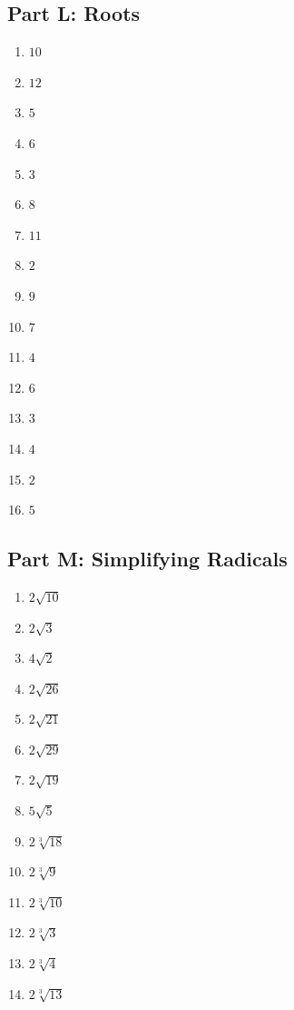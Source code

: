 \documentclass[11pt]{article}
\begin{document}
\subsection*{Part L: Roots}
\begin{multicols}{3}
\begin{enumerate}
  \item $10$
  \item $12$
  \item $5$
  \item $6$
  \item $3$
  \item $8$
  \item $11$
  \item $2$
  \item $9$
  \item $7$
  \item $4$
  \item $6$
  \item $3$
  \item $4$
  \item $2$
  \item $5$
\end{enumerate}
\end{multicols}
\subsection*{Part M: Simplifying Radicals}
\begin{multicols}{3}
\begin{enumerate}
  \item $2 \sqrt{10}$
  \item $2 \sqrt{3}$
  \item $4 \sqrt{2}$
  \item $2 \sqrt{26}$
  \item $2 \sqrt{21}$
  \item $2 \sqrt{29}$
  \item $2 \sqrt{19}$
  \item $5 \sqrt{5}$
  \item $2 \sqrt[3]{18}$
  \item $2 \sqrt[3]{9}$
  \item $2 \sqrt[3]{10}$
  \item $2 \sqrt[3]{3}$
  \item $2 \sqrt[3]{4}$
  \item $2 \sqrt[3]{13}$
\end{enumerate}
\end{multicols}
\end{document}
